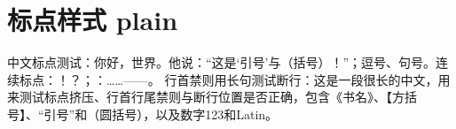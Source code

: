 \documentclass[a4paper,10pt,UTF8,scheme=chinese]{ctexart}
\begin{document}
\section{标点样式 plain}
中文标点测试：你好，世界。他说：“这是‘引号’与（括号）！”；逗号、句号。连续标点：！？；：……——。
行首禁则用长句测试断行：这是一段很长的中文，用来测试标点挤压、行首行尾禁则与断行位置是否正确，包含《书名》、【方括号】、“引号”和（圆括号），以及数字123和Latin。
\end{document}
